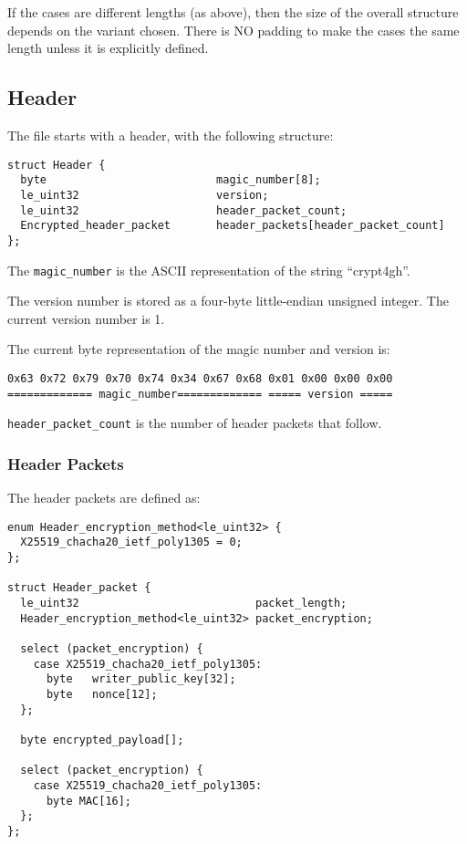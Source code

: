 \documentclass[10pt]{article}
\newcommand{\kw}[1]{\texttt{#1}}
\begin{document}
If the cases are different lengths (as above), then the size of the overall structure depends on the variant chosen.
There is NO padding to make the cases the same length unless it is explicitly defined.

\subsection{Header}

The file starts with a header, with the following structure:

\begin{verbatim}
struct Header {
  byte                          magic_number[8];
  le_uint32                     version;
  le_uint32                     header_packet_count;
  Encrypted_header_packet       header_packets[header_packet_count]
};
\end{verbatim}

The \kw{magic\_number} is the ASCII representation of the string ``crypt4gh''.

The version number is stored as a four-byte little-endian unsigned integer.
The current version number is 1.

The current byte representation of the magic number and version is:
\begin{verbatim}
0x63 0x72 0x79 0x70 0x74 0x34 0x67 0x68 0x01 0x00 0x00 0x00
============= magic_number============= ===== version =====
\end{verbatim}

\kw{header\_packet\_count} is the number of header packets that follow.

\subsubsection{Header Packets}\label{header:encryption}

The header packets are defined as:

\begin{verbatim}
enum Header_encryption_method<le_uint32> {
  X25519_chacha20_ietf_poly1305 = 0;
};

struct Header_packet {
  le_uint32                           packet_length;
  Header_encryption_method<le_uint32> packet_encryption;

  select (packet_encryption) {
    case X25519_chacha20_ietf_poly1305:
      byte   writer_public_key[32];
      byte   nonce[12];
  };

  byte encrypted_payload[];

  select (packet_encryption) {
    case X25519_chacha20_ietf_poly1305:
      byte MAC[16];
  };
};
\end{verbatim}
\end{document}
